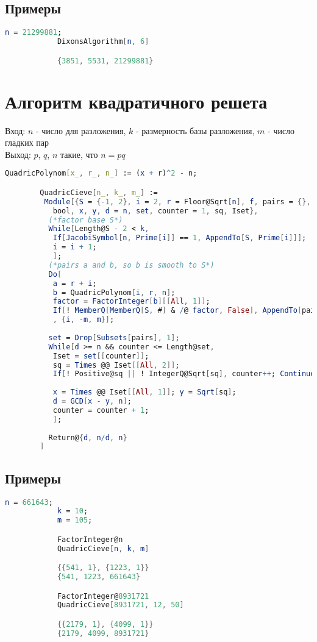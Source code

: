     	\subsection{Примеры}

    		\begin{lstlisting}[language=Mathematica,caption={
	      		Пример 1
	    	}]
			n = 21299881;
			DixonsAlgorithm[n, 6]

			{3851, 5531, 21299881}
	    	\end{lstlisting}

	\section{Алгоритм квадратичного решета}
		Вход: $n$ - число для разложения, $k$ - размерность базы разложения, $m$ - число гладких пар \\
		Выход: $p$, $q$, $n$ такие, что $n = p q$

		\begin{lstlisting}[language=Mathematica,caption={
      		Алгоритм квадратичного решета
    	}]
		QuadricPolynom[x_, r_, n_] := (x + r)^2 - n;

		QuadricCieve[n_, k_, m_] := 
		 Module[{S = {-1, 2}, i = 2, r = Floor@Sqrt[n], f, pairs = {}, a, b, factor, 
		   bool, x, y, d = n, set, counter = 1, sq, Iset},
		  (*factor base S*)
		  While[Length@S - 2 < k,
		   If[JacobiSymbol[n, Prime[i]] == 1, AppendTo[S, Prime[i]]];
		   i = i + 1;
		   ];
		  (*pairs a and b, so b is smooth to S*)
		  Do[
		   a = r + i;
		   b = QuadricPolynom[i, r, n];
		   factor = FactorInteger[b][[All, 1]];
		   If[! MemberQ[MemberQ[S, #] & /@ factor, False], AppendTo[pairs, {a, b}]];
		   , {i, -m, m}];
		  
		  set = Drop[Subsets[pairs], 1];
		  While[d >= n && counter <= Length@set,
		   Iset = set[[counter]];
		   sq = Times @@ Iset[[All, 2]];
		   If[! Positive@sq || ! IntegerQ@Sqrt[sq], counter++; Continue[]];
		   
		   x = Times @@ Iset[[All, 1]]; y = Sqrt[sq];
		   d = GCD[x - y, n];
		   counter = counter + 1;
		   ];
		  
		  Return@{d, n/d, n}
		]
    	\end{lstlisting}

    	\subsection{Примеры}

    		\begin{lstlisting}[language=Mathematica,caption={
	      		Пример 1
	    	}]
			n = 661643;
			k = 10;
			m = 105;

			FactorInteger@n
			QuadricCieve[n, k, m]

			{{541, 1}, {1223, 1}}
			{541, 1223, 661643}

			FactorInteger@8931721
			QuadricCieve[8931721, 12, 50]

			{{2179, 1}, {4099, 1}}
			{2179, 4099, 8931721}
	    	\end{lstlisting}



